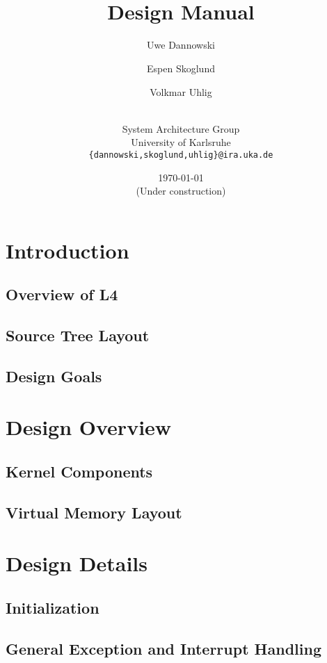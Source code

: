 \documentclass[a4paper,twoside]{book}
\title{\lka \\ Design Manual \vspace*{5mm}}
\author{
  \hspace*{1mm} Uwe Dannowski \hspace*{1mm} \and
  \hspace*{1mm} Espen Skoglund \hspace*{1mm} \and
  \hspace*{1mm} Volkmar Uhlig \hspace*{1mm} \and
  \\
  System Architecture Group \\
  University of Karlsruhe \\
  \texttt{\small \{dannowski,skoglund,uhlig\}@ira.uka.de}
  \vspace*{10mm}}
\date{\today \\ {\small (Under construction)}}
\begin{document}
\maketitle{}

\listoffigures{}

\tableofcontents{}



\chapter{Introduction}

\section{Overview of L4}

\section{Source Tree Layout}

\section{Design Goals}



\chapter{Design Overview}

\section{Kernel Components}

\section{Virtual Memory Layout}



\chapter{Design Details}

\section{Initialization}

\section{General Exception and Interrupt Handling}
\end{document}
